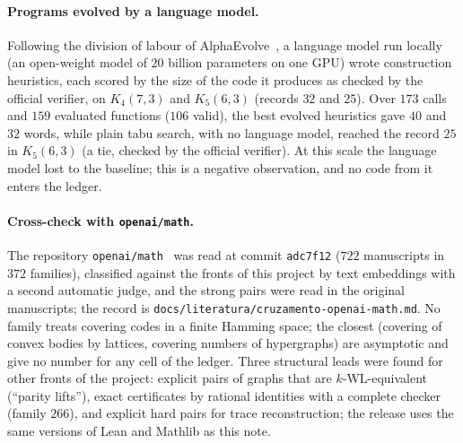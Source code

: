 \documentclass[11pt]{amsart}
\theoremstyle{definition}
\theoremstyle{remark}
\begin{document}
\paragraph{Programs evolved by a language model.}
Following the division of labour of AlphaEvolve~\cite{alphaevolve}, a language model run locally (an open-weight model of $20$ billion parameters on one GPU) wrote construction heuristics, each scored by the size of the code it produces as checked by the official verifier, on $K_4(7,3)$ and $K_5(6,3)$ (records $32$ and $25$).
Over $173$ calls and $159$ evaluated functions ($106$ valid), the best evolved heuristics gave $40$ and $32$ words, while plain tabu search, with no language model, reached the record $25$ in $K_5(6,3)$ (a tie, checked by the official verifier).
At this scale the language model lost to the baseline; this is a negative observation, and no code from it enters the ledger.

\paragraph{Cross-check with \texttt{openai/math}.}
The repository \texttt{openai/math}~\cite{openaimath} was read at commit \texttt{adc7f12} ($722$ manuscripts in $372$ families), classified against the fronts of this project by text embeddings with a second automatic judge, and the strong pairs were read in the original manuscripts; the record is \texttt{docs/\allowbreak literatura/\allowbreak cruzamento-openai-math.md}.
No family treats covering codes in a finite Hamming space; the closest (covering of convex bodies by lattices, covering numbers of hypergraphs) are asymptotic and give no number for any cell of the ledger.
Three structural leads were found for other fronts of the project: explicit pairs of graphs that are $k$-WL-equivalent (``parity lifts''), exact certificates by rational identities with a complete checker (family $266$), and explicit hard pairs for trace reconstruction; the release uses the same versions of Lean and Mathlib as this note.
\end{document}
